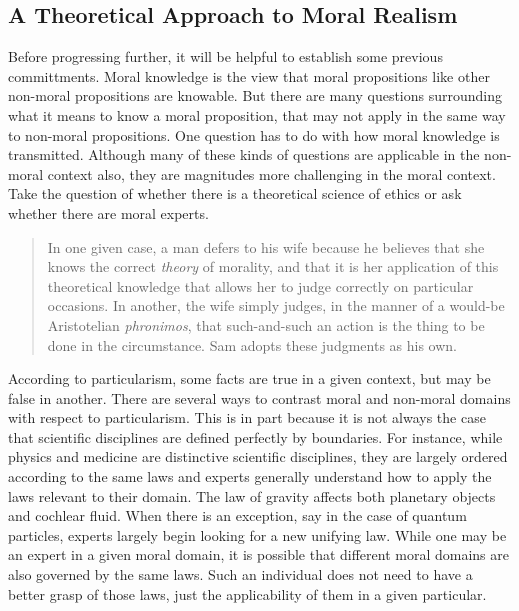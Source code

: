 \documentclass[phdthesis,12pt,final,a4paper]{wuthesis}
\theoremstyle{definition}
\theoremstyle{definition}
\theoremstyle{definition}
\theoremstyle{definition}
\theoremstyle{remark}
\begin{document}
\subsection*{A Theoretical Approach to Moral Realism}\label{a-theoretical-approach-to-moral-realism}

Before progressing further, it will be helpful to establish some previous committments. Moral knowledge is the view that moral propositions like other non-moral propositions are knowable. But there are many questions surrounding what it means to know a moral proposition, that may not apply in the same way to non-moral propositions. One question has to do with how moral knowledge is transmitted. Although many of these kinds of questions are applicable in the non-moral context also, they are magnitudes more challenging in the moral context. Take the question of whether there is a theoretical science of ethics or ask whether there are moral experts.

\begin{quote}
In one given case, a man defers to his wife because he believes that she knows the correct \emph{theory} of morality, and that it is her application of this theoretical knowledge that allows her to judge correctly on particular occasions. In another, the wife simply judges, in the manner of a would-be Aristotelian \emph{phronimos}, that such-and-such an action is the thing to be done in the circumstance. Sam adopts these judgments as his own.
\end{quote}

According to particularism, some facts are true in a given context, but may be false in another. There are several ways to contrast moral and non-moral domains with respect to particularism. This is in part because it is not always the case that scientific disciplines are defined perfectly by boundaries. For instance, while physics and medicine are distinctive scientific disciplines, they are largely ordered according to the same laws and experts generally understand how to apply the laws relevant to their domain. The law of gravity affects both planetary objects and cochlear fluid. When there is an exception, say in the case of quantum particles, experts largely begin looking for a new unifying law. While one may be an expert in a given moral domain, it is possible that different moral domains are also governed by the same laws. Such an individual does not need to have a better grasp of those laws, just the applicability of them in a given particular.
\end{document}
